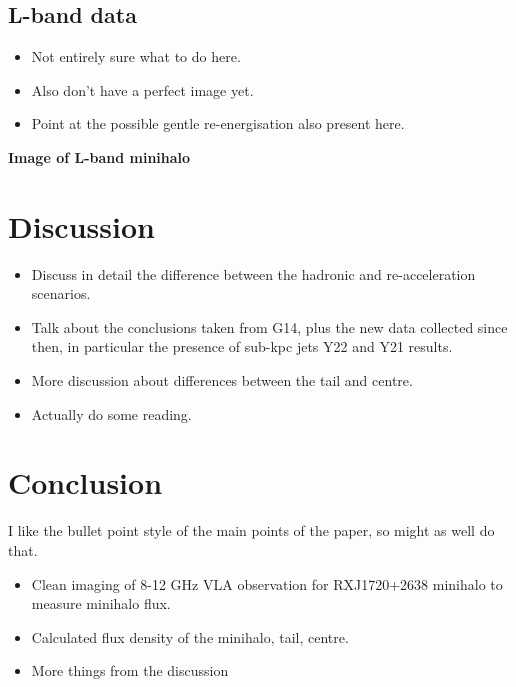 \documentclass{pas}
\begin{document}
\subsection{L-band data}
\begin{itemize}
  \item Not entirely sure what to do here.
  \item Also don't have a perfect image yet.
  \item Point at the possible gentle re-energisation also present here.
\end{itemize}
\textbf{Image of L-band minihalo}

\section{Discussion}
\begin{itemize}
  \item Discuss in detail the difference between the hadronic and re-acceleration scenarios.
  \item Talk about the conclusions taken from G14, plus the new data collected since then, in particular the presence of sub-kpc jets Y22 and Y21 results.
  \item More discussion about differences between the tail and centre. 
  \item Actually do some reading.
\end{itemize}

\section{Conclusion}
I like the bullet point style of the main points of the paper, so might as well do that.
\begin{itemize}
  \item Clean imaging of 8-12 GHz VLA observation for RXJ1720+2638 minihalo to measure minihalo flux.
  \item Calculated flux density of the minihalo, tail, centre.
  \item More things from the discussion
\end{itemize}

\begin{thebibliography}{}
\end{thebibliography}
\end{document}
